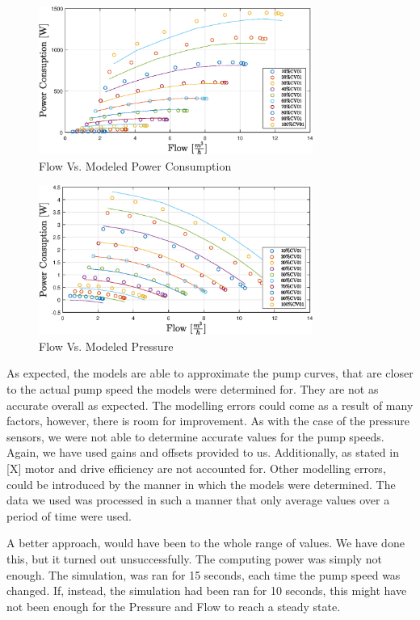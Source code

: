 \begin{figure}[ht]
	\centering
	\includegraphics[width=0.8\textwidth]{figures/06ModelValidation/flowVsModeledPowerConsumption.eps}
	\caption{Flow Vs. Modeled Power Consumption}
	\label{fig:flowVsModeledPower}
\end{figure}
\begin{figure}[ht]
	\centering
	\includegraphics[width=0.8\textwidth]{figures/06ModelValidation/flowVsModeledPressure.eps}
	\caption{Flow Vs. Modeled Pressure}
	\label{fig:flowVsModeledPressure}
\end{figure}

As expected, the models are able to approximate the pump curves, that are closer to the actual pump speed 
the models were determined for. They are not as accurate overall as expected. 
The modelling errors could come as a result of many factors, however, there is room for improvement. 
As with the case of the pressure sensors, we were not able to determine accurate values for 
the pump speeds. Again, we have used gains and offsets provided to us. Additionally, as stated in [X]
motor and drive efficiency are not accounted for.
\newpage
Other modelling errors, could be introduced by the manner in which the models were determined. The data we
used was processed in such a manner that only average values over a period of time were used.

A better approach, would have been to the whole range of values. We have done this, but it turned out unsuccessfully. The
computing power was simply not enough.
The simulation, was ran for 15 seconds, each time the pump speed was changed. If, instead, the simulation had been ran for
10 seconds, this might have not been enough for the Pressure and Flow to reach a steady state.
